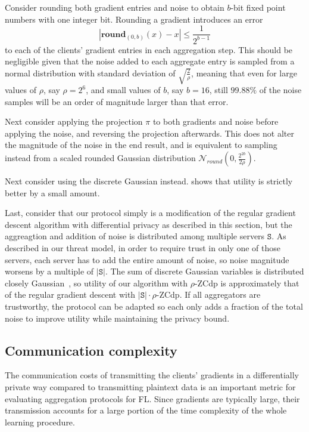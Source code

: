 \documentclass{article}
\begin{document}
Consider rounding both gradient entries and noise to obtain $b$-bit fixed point numbers with one integer bit. Rounding a gradient introduces an error
$$|\textbf{round}_{(0,b)}(x) - x|\leq\frac{1}{2^{b-1}}$$
to each of the clients' gradient entries in each aggregation step. This should be negligible given that the noise added to each aggregate entry is sampled from a normal distribution with standard deviation of $\sqrt{\frac{2}{\rho}}$, meaning that even for large values of $\rho$, say $\rho = 2^6$, and small values of $b$, say $b=16$, still $99.88\%$ of the noise samples will be an order of magnitude larger than that error.

Next consider applying the projection $\pi$ to both gradients and noise before applying the noise, and reversing the projection afterwards. This does not alter the magnitude of the noise in the end result, and is equivalent to sampling instead from a scaled rounded Gaussian distribution $\mathcal N_{round}\left(0,\frac{2^{2b}}{2\rho}\right)$.

Next consider using the discrete Gaussian instead. \cite[Corollary 17]{DBLP:journals/corr/abs-2004-00010} shows that utility is strictly better by a small amount.

Last, consider that our protocol simply is a modification of the regular gradient descent algorithm with differential privacy as described in this section, but the aggreagtion and addition of noise is distributed among multiple servers $\texttt{S}$. As described in our threat model, in order to require trust in only one of those servers, each server has to add the entire amount of noise, so noise magnitude worsens by a multiple of $|\texttt{S}|$. The sum of discrete Gaussian variables is distributed closely Gaussian~\cite[Theorem 11]{Kairouz2021TheDD}, so utility of our algorithm with $\rho$-ZCdp is approximately that of the regular gradient descent with $|\texttt{S}|\cdot\rho$-ZCdp. If all aggregators are trustworthy, the protocol can be adapted so each only adds a fraction of the total noise to improve utility while maintaining the privacy bound.


\subsection{Communication complexity}
The communication costs of transmitting the clients' gradients in a
differentially private way compared to transmitting plaintext data is an
important metric for evaluating aggregation protocols for FL. Since gradients
are typically large, their transmission accounts
for a large portion of the time complexity of the whole learning procedure.
\end{document}

